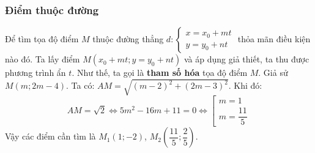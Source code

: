 \subsubsection{Điểm thuộc đường} 
Để tìm tọa độ điểm $M$ thuộc đường thẳng $d: \begin{cases} x= x_0+mt \\y=y_0+nt\end{cases}$ thỏa mãn điều kiện nào đó. Ta lấy điểm $M(x_0+mt;y=y_0+nt)$ và áp dụng giả thiết, ta thu được phương trình ẩn $t$. Như thế, ta gọi là \textbf{tham số hóa} tọa độ điểm $M$.
\lgi
Giả sử $M(m;2m-4)$. Ta có: $AM = \sqrt{(m-2)^2+(2m-3)^2}$. Khi đó:
$$AM=\sqrt{2}\Leftrightarrow 5m^2-16m+11 = 0 \Leftrightarrow \left[  \begin{array}{l}
m = 1 \\ m =\dfrac{11}{5}\end{array}\right.$$
Vậy các điểm cần tìm là $M_1(1;-2)$, $M_2\left(\dfrac{11}{5};\dfrac{2}{5}\right)$.
